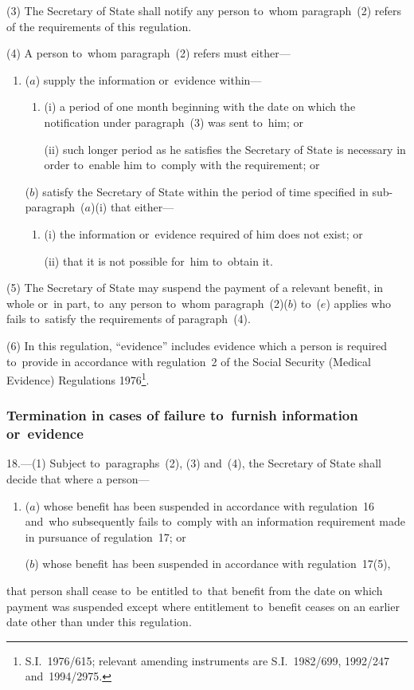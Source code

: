 \documentclass[12pt,a4paper]{article}
\begin{document}
(3) The Secretary of State shall notify any person to~whom paragraph~(2) refers of the requirements of this regulation.

(4) A person to~whom paragraph~(2) refers must either—
\begin{enumerate}\item[]
($a$) supply the information or~evidence within—
\begin{enumerate}\item[]
(i) a period of one month beginning with the date on which the notification under paragraph~(3) was sent to~him; or

(ii) such longer period as he satisfies the Secretary of State is necessary in order to~enable him to~comply with the requirement; or
\end{enumerate}

($b$) satisfy the Secretary of State within the period of time specified in sub-paragraph~($a$)(i) that either—
\begin{enumerate}\item[]
(i) the information or~evidence required of him does not exist; or

(ii) that it is not possible for~him to~obtain it.
\end{enumerate}
\end{enumerate}

(5) The Secretary of State may suspend the payment of a relevant benefit, in whole or~in part, to~any person to~whom paragraph~(2)($b$) to~($e$) applies who fails to~satisfy the requirements of paragraph~(4).

(6) In this regulation, “evidence” includes evidence which a person is required to~provide in accordance with regulation~2 of the Social Security (Medical Evidence) Regulations 1976\footnote{\frenchspacing S.I.~1976/615; relevant amending instruments are S.I.~1982/699, 1992/247 and~1994/2975.}.


\subsubsection[18. Termination in cases of failure to~furnish information or~evidence]{Termination in cases of failure to~furnish information or~evidence}

18.—(1) Subject to~paragraphs~(2), (3) and~(4), the Secretary of State shall decide that where a person—
\begin{enumerate}\item[]
($a$) whose benefit has been suspended in accordance with regulation~16 and~who subsequently fails to~comply with an information requirement made in pursuance of regulation~17; or

($b$) whose benefit has been suspended in accordance with regulation~17(5),
\end{enumerate}
that person shall cease to~be entitled to~that benefit from the date on which payment was suspended except where entitlement to~benefit ceases on an earlier date other than under this regulation.
\end{document}

